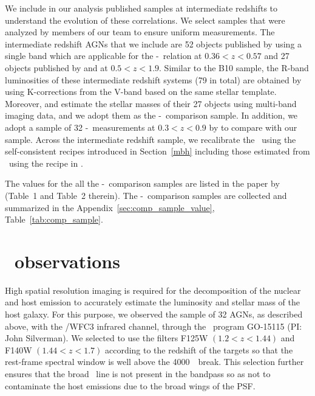 \documentclass[apj]{emulateapj}
\begin{document}
We include in our analysis published samples at intermediate redshifts to understand the evolution of these correlations. We select samples that were analyzed by members of our team to ensure uniform measurements. The intermediate redshift AGNs that we include are 52 objects published by \citet{Park15} using a single band which are applicable for the \mbh-\lhost\ relation at $0.36<z<0.57$ and 27 objects published by \citet{Bennert11} and \citet{SS13} at $0.5<z<1.9$. Similar to the B10 sample, the R-band luminosities of these intermediate redshift systems (79 in total) are obtained by \citet{Ding2017b} using K-corrections from the V-band based on the same stellar template. Moreover, \citet{Bennert11} and \citet{SS13} estimate the stellar masses of their 27 objects using multi-band imaging data, and we adopt them as the \mbh-\smass\ comparison sample.
 In addition, we adopt a sample of 32 \mbh-\smass\ measurements at $0.3<z<0.9$ by \citet{Cisternas2011} to compare with our sample. Across the intermediate redshift sample, we recalibrate the \mbh\ using the self-consistent recipes introduced in Section~\ref{mbh} including those estimated from \Mgii\ using the recipe in \citet{Ding2017b}. 

The values for the all the \mbh-\lhost\ comparison samples are listed in the paper by \citet{Ding2017b} (Table~1 and Table~2 therein). The \mbh-\smass\ comparison samples are collected and summarized in the Appendix~\ref{sec:comp_sample_value}, Table~\ref{tab:comp_sample}.

\section{\hst\ observations}
\label{observation}
High spatial resolution imaging is required for the decomposition of the nuclear and host emission to accurately estimate the luminosity and stellar mass of the host galaxy. For this purpose, we observed the sample of 32 AGNs, as described above, with the \hst/WFC3 infrared channel, through the \hst\ program GO-15115 (PI: John Silverman). We selected to use the filters F125W $(1.2<z<1.44)$ and F140W $(1.44<z<1.7)$ according to the redshift of the targets so that the rest-frame spectral window is well above the 4000~\angstrom\ break. This selection further ensures that the broad \halpha\ line is not present in the bandpass so as not to contaminate the host emissions due to the broad wings of the PSF.
\end{document}

